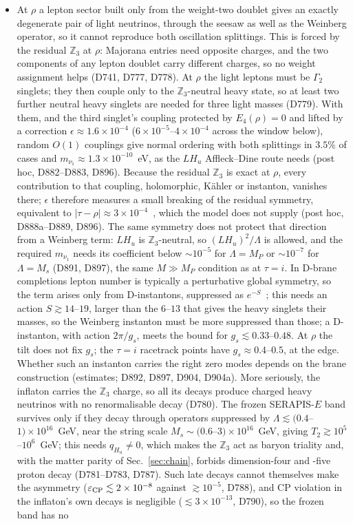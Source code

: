 \documentclass[aps,prd,twocolumn,superscriptaddress,nofootinbib,floatfix]{revtex4-2}
\begin{document}
\begin{itemize}
\item At $\rho$ a lepton sector built only from the weight-two doublet gives an exactly degenerate pair of light neutrinos, through the seesaw as well as the Weinberg operator, so it cannot reproduce both oscillation splittings. This is forced by the residual $\mathbb{Z}_3$ at $\rho$: Majorana entries need opposite charges, and the two components of any lepton doublet carry different charges, so no weight assignment helps (D741, D777, D778). At $\rho$ the light leptons must be $\Gamma_2$ singlets; they then couple only to the $\mathbb{Z}_3$-neutral heavy state, so at least two further neutral heavy singlets are needed for three light masses (D779). With them, and the third singlet's coupling protected by $E_4(\rho)=0$ and lifted by a correction $\epsilon\approx1.6\times10^{-4}$ ($6\times10^{-5}$--$4\times10^{-4}$ across the window below), random $O(1)$ couplings give normal ordering with both splittings in $3.5\%$ of cases and $m_{\nu_1}\approx1.3\times10^{-10}$~eV, as the $LH_u$ Affleck--Dine route needs (post hoc, D882--D883, D896). Because the residual $\mathbb{Z}_3$ is exact at $\rho$, every contribution to that coupling, holomorphic, K\"ahler or instanton, vanishes there; $\epsilon$ therefore measures a small breaking of the residual symmetry, equivalent to $|\tau-\rho|\approx3\times10^{-4}$~\cite{arXiv_2102_07488}, which the model does not supply (post hoc, D888a--D889, D896). The same symmetry does not protect that direction from a Weinberg term: $LH_u$ is $\mathbb{Z}_3$-neutral, so $(LH_u)^2/\Lambda$ is allowed, and the required $m_{\nu_1}$ needs its coefficient below $\sim10^{-5}$ for $\Lambda=M_P$ or $\sim10^{-7}$ for $\Lambda=M_s$ (D891, D897), the same $M\gg M_P$ condition as at $\tau=i$. In D-brane completions lepton number is typically a perturbative global symmetry, so the term arises only from D-instantons, suppressed as $e^{-S}$~\cite{arXiv_1112_5992,arXiv_hep-th_0609191}; this needs an action $S\gtrsim14$--$19$, larger than the $6$--$13$ that gives the heavy singlets their masses, so the Weinberg instanton must be more suppressed than those; a D-instanton, with action $2\pi/g_s$, meets the bound for $g_s\lesssim0.33$--$0.48$. At $\rho$ the tilt does not fix $g_s$; the $\tau=i$ racetrack points have $g_s\approx0.4$--$0.5$, at the edge. Whether such an instanton carries the right zero modes depends on the brane construction (estimates; D892, D897, D904, D904a). More seriously, the inflaton carries the $\mathbb{Z}_3$ charge, so all its decays produce charged heavy neutrinos with no renormalisable decay (D780). The frozen SERAPIS-$E$ band survives only if they decay through operators suppressed by $\Lambda\lesssim(0.4$--$1)\times10^{16}$~GeV, near the string scale $M_s\sim(0.6$--$3)\times10^{16}$~GeV, giving $T_2\gtrsim10^5$--$10^6$~GeV; this needs $q_{H_u}\neq0$, which makes the $\mathbb{Z}_3$ act as baryon triality and, with the matter parity of Sec.~\ref{sec:chain}, forbids dimension-four and -five proton decay (D781--D783, D787). Such late decays cannot themselves make the asymmetry ($\varepsilon_{\rm CP}\lesssim2\times10^{-8}$ against $\gtrsim10^{-5}$, D788), and CP violation in the inflaton's own decays is negligible ($\lesssim3\times10^{-13}$, D790), so the frozen band has no 
\end{itemize}
\end{document}
